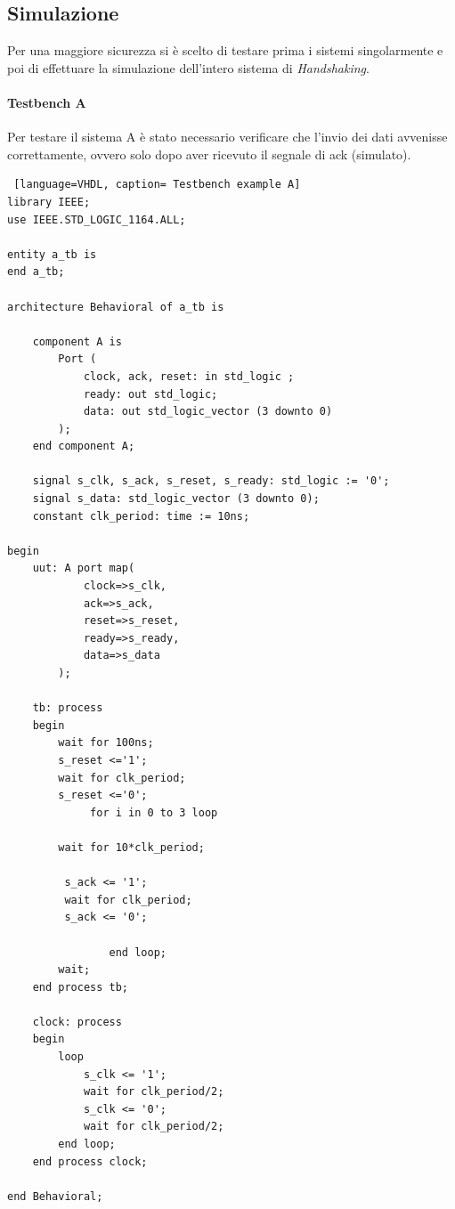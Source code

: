 \subsection{Simulazione}
Per una maggiore sicurezza si è scelto di testare prima i sistemi singolarmente e poi di effettuare la simulazione dell'intero sistema di \textit{Handshaking}.

\paragraph{Testbench A}
Per testare il sistema A è stato necessario verificare che l'invio dei dati avvenisse correttamente, ovvero solo dopo aver ricevuto il segnale di ack (simulato). 
\begin{lstlisting} [language=VHDL, caption= Testbench example A]
library IEEE;
use IEEE.STD_LOGIC_1164.ALL;

entity a_tb is
end a_tb;

architecture Behavioral of a_tb is

    component A is
        Port (
            clock, ack, reset: in std_logic ;
            ready: out std_logic;
            data: out std_logic_vector (3 downto 0)
        );
    end component A;

    signal s_clk, s_ack, s_reset, s_ready: std_logic := '0';
    signal s_data: std_logic_vector (3 downto 0);
    constant clk_period: time := 10ns;

begin
    uut: A port map(
            clock=>s_clk,
            ack=>s_ack,
            reset=>s_reset,
            ready=>s_ready,
            data=>s_data
        );

    tb: process
    begin
        wait for 100ns;
        s_reset <='1';
        wait for clk_period;
        s_reset <='0';
             for i in 0 to 3 loop

        wait for 10*clk_period;
        
         s_ack <= '1';
         wait for clk_period;
         s_ack <= '0';

                end loop;
        wait;
    end process tb;

    clock: process
    begin
        loop
            s_clk <= '1';
            wait for clk_period/2;
            s_clk <= '0';
            wait for clk_period/2;
        end loop;
    end process clock;
    
end Behavioral;

\end{lstlisting}

